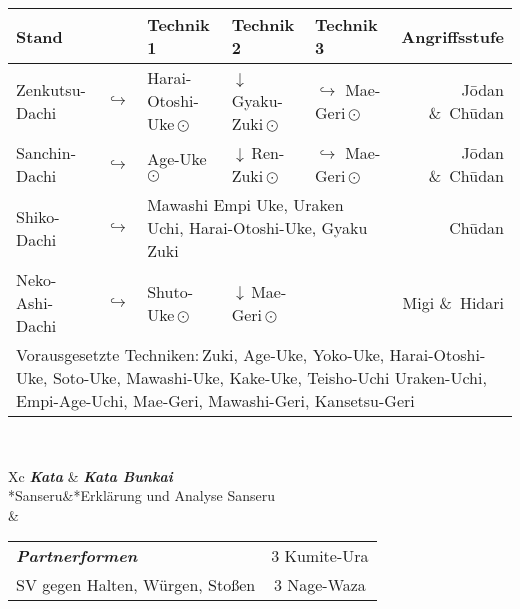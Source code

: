 	\null\vfill\null
	\begin{tabularx}{\textwidth}{llllXr}
		\textbf{Stand} 	&  	& \textbf{Technik 1} & \textbf{Technik 2} 				& \textbf{Technik 3}& \textbf{Angriffsstufe}\\
		\midrule
		Zenkutsu-Dachi 	& \(\hookrightarrow\)	& Harai-Otoshi-Uke\,\(\odot\) 	& \(\downarrow\)\,Gyaku-Zuki\,\(\odot\)	& \(\hookrightarrow\) 	 Mae-Geri\,\(\odot\)	& J\={o}dan \&~Ch\={u}dan \\
		Sanchin-Dachi 	& \(\hookrightarrow\)	& Age-Uke\,\(\odot\) 			& \(\downarrow\)\,Ren-Zuki\,\(\odot\) & \(\hookrightarrow\)	 Mae-Geri\,\(\odot\)	& J\={o}dan \&~Ch\={u}dan \\
		Shiko-Dachi 	& \(\hookrightarrow\)	&\multicolumn{3}{l}{Mawashi Empi Uke, Uraken Uchi, Harai-Otoshi-Uke, Gyaku Zuki}	&	 					 Ch\={u}dan \\
		Neko-Ashi-Dachi	& \(\hookrightarrow\)	& Shuto-Uke\,\(\odot\) 			& \(\downarrow\)\,Mae-Geri\,\(\odot\) 					&						& 						 Migi \&~Hidari  \\
		\midrule
		\multicolumn{6}{p{\linewidth-2\tabcolsep}}{{\footnotesize Vorausgesetzte Techniken:\,Zuki, Age-Uke, Yoko-Uke, Harai-Otoshi-Uke, Soto-Uke, Mawashi-Uke, Kake-Uke, Teisho-Uchi Uraken-Uchi, Empi-Age-Uchi, Mae-Geri, Mawashi-Geri, Kansetsu-Geri}}\\
		\midrule
	\end{tabularx}\\
	\null\vfill\null
	\begin{minipage}[t]{0.45\textwidth}
		\begin{tabularx}{\textwidth}{Xc}
			\midrule
			\textbf{\textit{Kata}} & \textbf{\textit{Kata Bunkai}} \\
			*{Sanseru}&*{Erklärung und Analyse Sanseru}\\
			& \\
			\midrule
		\end{tabularx}
	\end{minipage}
	\null\hfill\null
	\begin{minipage}[t]{0.45\textwidth}
		\begin{tabularx}{\textwidth}{Xc}
			\midrule
			{\textbf{\textit{Partnerformen}}} & 3 Kumite-Ura\\
			SV gegen Halten, Würgen, Stoßen & 3 Nage-Waza  \\
			\midrule
		\end{tabularx}
	\end{minipage}\\
	\null\vfill\null
